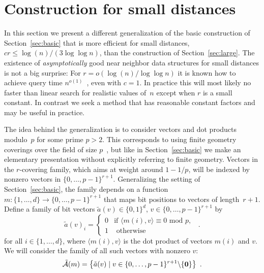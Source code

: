 \documentclass[prodmode,acmtalg]{acmsmall}
\begin{document}
\section{Construction for small distances}\label{sec:small-radius}

In this section we present a different generalization of the basic construction of Section~\ref{sec:basic} that is more efficient for small distances, $cr\leq \log(n)/(3\log\log n)$, than the construction of Section~\ref{sec:large}.
The existence of \emph{asymptotically} good near neighbor data structures for small distances is not a big surprise: For $r = o(\log(n)/\log\log n)$ it is known how to achieve query time $n^{o(1)}$~\cite{Cole:2004:DMI:1007352.1007374}, even with $c=1$.
In practice this will most likely no faster than linear search for realistic values of~$n$ except when $r$ is a small constant.
In contrast we seek a method that has reasonable constant factors and may be useful in practice.

The idea behind the generalization is to consider vectors and dot products modulo~$p$ for some prime $p>2$.
This corresponds to using finite geometry coverings over the field of size $p$~\cite{gordon1995new}, but like in Section~\ref{sec:basic} we make an elementary presentation without explicitly referring to finite geometry.
Vectors in the $r$-covering family, which aims at weight around $1-1/p$, will be indexed by nonzero vectors in $\{0,\dots,p-1\}^{r+1}$.
Generalizing the setting of Section~\ref{sec:basic}, the family depends on a function $m: \{1,\dots,d\} \rightarrow \{0,\dots,p-1\}^{r+1}$ that maps bit positions to vectors of length~$r+1$. 
Define a family of bit vectors $\tilde{a}(v) \in \{0,1\}^d$, $v\in \{0,\dots,p-1\}^{r+1}$ by
\begin{equation}\label{def:Atilde_v}
 \tilde{a}(v)_i = \left\{ \begin{array}{ll}
 0 & \text{if } \langle m(i),v\rangle \equiv 0 \text{ mod } p,\\
 1 & \text{ otherwise}
 \end{array} \right. \enspace .
\end{equation}
for all $i\in\{1,\dots,d\}$, where $\langle m(i), v\rangle$ is the dot product of vectors $m(i)$ and $v$.
We will consider the family of all such vectors with nonzero $v$:
\begin{equation*}\tilde{\mathcal{A}}(m) = \big\{ \tilde{a}(v) \; | \; v\in \{0,\dots,p-1\}^{r+1} \backslash \{{\bf 0}\} \big\} \enspace .
\end{equation*}
\end{document}
